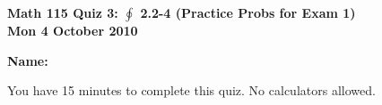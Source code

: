 \documentclass[11pt,letterpaper]{article}
\begin{document}
\flushleft
\begin{multicols}{2}


\begin{large}\textbf{Math 115 Quiz 3: $\oint $ 2.2-4 (Practice Probs for Exam 1) \\
Mon 4 October 2010}\end{large}

\textbf{Name:  }\underline{\hspace{35ex}}

\vspace{.5in}

\end{multicols}

\pagestyle{empty}


\flushleft

You have 15 minutes to complete this quiz.  No calculators allowed.  
\end{document}
